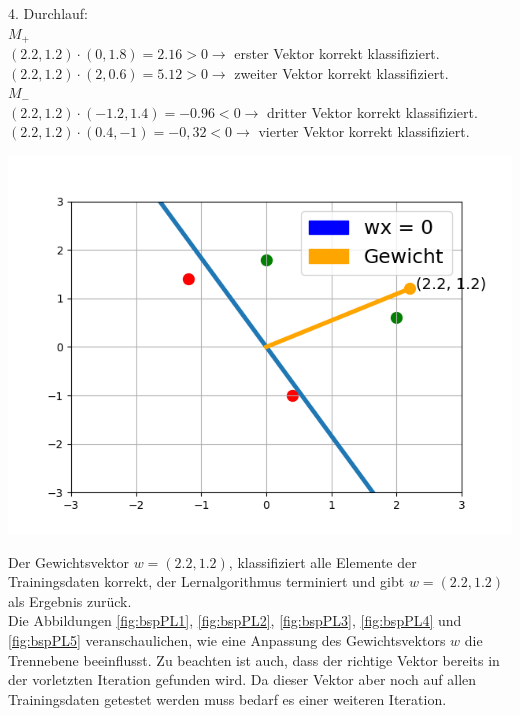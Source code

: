 \documentclass[fontsize=11pt]{scrartcl}
\newenvironment{Figure}
  {\par\medskip\noindent\minipage{\linewidth}}
  {\endminipage\par\medskip}
\begin{document}
                        4. Durchlauf:\\
                        $M_+$\\
                        $(2.2,1.2)\cdot (0,1.8) = 2.16 > 0 \rightarrow$ erster Vektor korrekt klassifiziert.\\
                        $(2.2,1.2)\cdot (2,0.6) = 5.12 > 0 \rightarrow$ zweiter Vektor korrekt klassifiziert.\\
                        $M_-$\\
                        $(2.2,1.2)\cdot (-1.2,1.4) = -0.96 < 0 \rightarrow$ dritter Vektor korrekt klassifiziert.\\
                        $(2.2,1.2)\cdot (0.4,-1) = -0,32 < 0 \rightarrow$ vierter Vektor korrekt klassifiziert.
                        \begin{Figure}
                            \centering
                            \includegraphics[scale=0.5]{bsp4.png}
                            \label{fig:bspPL5}    
                        \end{Figure}
                        Der Gewichtsvektor $w = (2.2,1.2)$, klassifiziert alle Elemente der Trainingsdaten korrekt, der Lernalgorithmus terminiert und gibt $w = (2.2,1.2)$ als Ergebnis zurück.\\
                        Die Abbildungen \ref{fig:bspPL1}, \ref{fig:bspPL2}, \ref{fig:bspPL3}, \ref{fig:bspPL4} und \ref{fig:bspPL5} veranschaulichen, wie eine Anpassung des Gewichtsvektors $w$ die Trennebene beeinflusst.
                        Zu beachten ist auch, dass der richtige Vektor bereits in der vorletzten Iteration gefunden wird. Da dieser Vektor aber noch auf allen Trainingsdaten getestet werden muss bedarf es einer weiteren Iteration.
\end{document}

